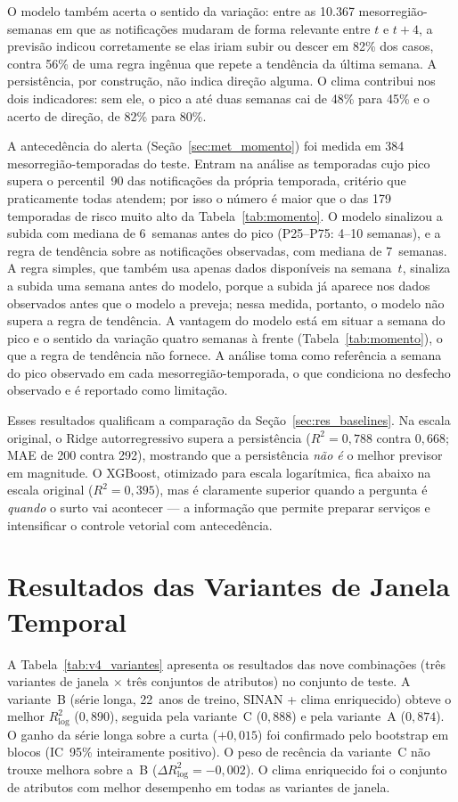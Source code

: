 O modelo também acerta o sentido da variação: entre as 10.367 mesorregião-semanas em que as notificações mudaram de forma relevante entre $t$ e $t+4$, a previsão indicou corretamente se elas iriam subir ou descer em 82\% dos casos, contra 56\% de uma regra ingênua que repete a tendência da última semana. A persistência, por construção, não indica direção alguma. O clima contribui nos dois indicadores: sem ele, o pico a até duas semanas cai de 48\% para 45\% e o acerto de direção, de 82\% para 80\%.

A antecedência do alerta (Seção~\ref{sec:met_momento}) foi medida em 384 mesorregião-temporadas do teste. Entram na análise as temporadas cujo pico supera o percentil~90 das notificações da própria temporada, critério que praticamente todas atendem; por isso o número é maior que o das 179 temporadas de risco muito alto da Tabela~\ref{tab:momento}. O modelo sinalizou a subida com mediana de 6~semanas antes do pico (P25--P75: 4--10 semanas), e a regra de tendência sobre as notificações observadas, com mediana de 7~semanas. A regra simples, que também usa apenas dados disponíveis na semana~$t$, sinaliza a subida uma semana antes do modelo, porque a subida já aparece nos dados observados antes que o modelo a preveja; nessa medida, portanto, o modelo não supera a regra de tendência. A vantagem do modelo está em situar a semana do pico e o sentido da variação quatro semanas à frente (Tabela~\ref{tab:momento}), o que a regra de tendência não fornece. A análise toma como referência a semana do pico observado em cada mesorregião-temporada, o que condiciona no desfecho observado e é reportado como limitação.

Esses resultados qualificam a comparação da Seção~\ref{sec:res_baselines}. Na escala original, o Ridge autorregressivo supera a persistência ($R^2=0{,}788$ contra $0{,}668$; MAE de 200 contra 292), mostrando que a persistência \textit{não é} o melhor previsor em magnitude. O XGBoost, otimizado para escala logarítmica, fica abaixo na escala original ($R^2=0{,}395$), mas é claramente superior quando a pergunta é \textit{quando} o surto vai acontecer --- a informação que permite preparar serviços e intensificar o controle vetorial com antecedência.

\section{Resultados das Variantes de Janela Temporal}
\label{sec:res_variantes}

A Tabela~\ref{tab:v4_variantes} apresenta os resultados das nove combinações (três variantes de janela $\times$ três conjuntos de atributos) no conjunto de teste. A variante~B (série longa, 22~anos de treino, SINAN + clima enriquecido) obteve o melhor $R^2_{\log}$ ($0{,}890$), seguida pela variante~C ($0{,}888$) e pela variante~A ($0{,}874$). O ganho da série longa sobre a curta ($+0{,}015$) foi confirmado pelo bootstrap em blocos (IC~95\% inteiramente positivo). O peso de recência da variante~C não trouxe melhora sobre a~B ($\Delta R^2_{\log} = -0{,}002$). O clima enriquecido foi o conjunto de atributos com melhor desempenho em todas as variantes de janela.

